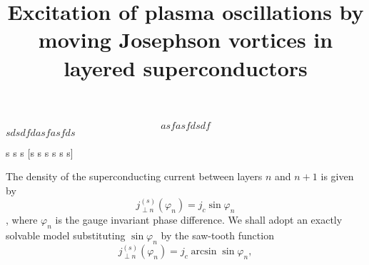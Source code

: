 %
%

$$  asf asfd sdf $$
$ s  { d { sdf } d } asfa sfd  s $

{s    s    s}
[s s s s s s]


\title{Excitation of plasma oscillations by moving Josephson vortices in
layered superconductors}
\author{ }
\maketitle

The density of the superconducting current between layers $n$ and $n+1$ is
given by $$j^{(s)}_{\perp n}(\varphi_n)=j_c \sin{\varphi_n}$$,
where $\varphi_n$ is the gauge invariant phase difference. We shall adopt an
exactly solvable model substituting $\sin{\varphi_n}$ by the saw-tooth
function
\begin{equation}
%
%
j^{(s)}_{\perp n}(\varphi_n)=j_c\arcsin{\sin{\varphi_n}},
\end{equation}


